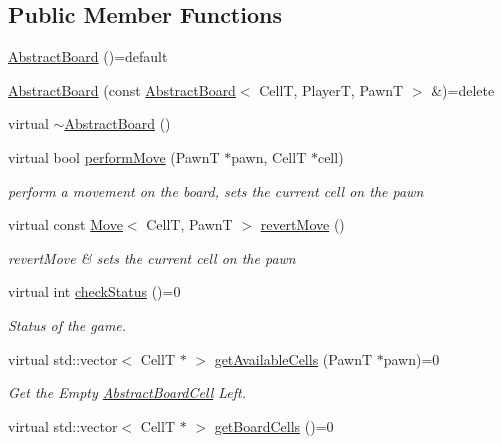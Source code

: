 \subsection*{Public Member Functions}
\begin{DoxyCompactItemize}
\item 
\hyperlink{classgame_1_1_abstract_board_a09c49d38999e508f5bc1915209b3cb56}{Abstract\+Board} ()=default
\item 
\hyperlink{classgame_1_1_abstract_board_a648d91d9ffa74ec73fa0844903d9a0fa}{Abstract\+Board} (const \hyperlink{classgame_1_1_abstract_board}{Abstract\+Board}$<$ CellT, PlayerT, PawnT $>$ \&)=delete
\item 
virtual \hyperlink{classgame_1_1_abstract_board_a1331343872024287df1749cea4a96f5e}{$\sim$\+Abstract\+Board} ()
\item 
virtual bool \hyperlink{classgame_1_1_abstract_board_ac2b6d96389ad0ac58d22323d75f91f97}{perform\+Move} (PawnT $\ast$pawn, CellT $\ast$cell)
\begin{DoxyCompactList}\small\item\em perform a movement on the board, sets the current cell on the pawn \end{DoxyCompactList}\item 
virtual const \hyperlink{structgame_1_1_move}{Move}$<$ CellT, PawnT $>$ \hyperlink{classgame_1_1_abstract_board_acc2d5fac68ec019e42fe166b727b7299}{revert\+Move} ()
\begin{DoxyCompactList}\small\item\em revert\+Move \& sets the current cell on the pawn \end{DoxyCompactList}\item 
virtual int \hyperlink{classgame_1_1_abstract_board_a689982e6640633d78008157906c6d63a}{check\+Status} ()=0
\begin{DoxyCompactList}\small\item\em Status of the game. \end{DoxyCompactList}\item 
virtual std\+::vector$<$ CellT $\ast$ $>$ \hyperlink{classgame_1_1_abstract_board_a8def8902ce65947b506ecb129cb7b918}{get\+Available\+Cells} (PawnT $\ast$pawn)=0
\begin{DoxyCompactList}\small\item\em Get the Empty \hyperlink{classgame_1_1_abstract_board_cell}{Abstract\+Board\+Cell} Left. \end{DoxyCompactList}\item 
virtual std\+::vector$<$ CellT $\ast$ $>$ \hyperlink{classgame_1_1_abstract_board_a73d6bef66826688cd6e2bc0f37acb4b0}{get\+Board\+Cells} ()=0

\end{DoxyCompactItemize}

